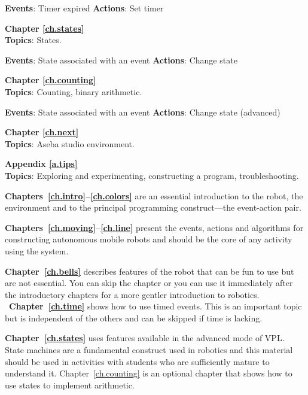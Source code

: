 \textbf{Events}: Timer expired \hfill \textbf{Actions}: Set timer

 \hfill {}

\bigskip

{\centering \textbf{Chapter \ref{ch.states}}\\}
\textbf{Topics}: States.

\textbf{Events}: State associated with an event \hfill \textbf{Actions}: Change state

 \hfill {}

\bigskip

{\centering \textbf{Chapter \ref{ch.counting}}\\}
\textbf{Topics}: Counting, binary arithmetic.

\textbf{Events}: State associated with an event  \hfill \textbf{Actions}: Change state (advanced)

 \hfill {}

\bigskip

{\centering \textbf{Chapter \ref{ch.next}}\\}
\textbf{Topics}: Aseba studio environment.

\bigskip

{\centering \textbf{Appendix \ref{a.tips}}\\}
\textbf{Topics}: Exploring and experimenting,
constructing a program, troubleshooting.



\textbf{Chapters~\ref{ch.intro}--\ref{ch.colors}} are an essential introduction
to the robot, the environment and to the principal programming construct---the
event-action pair.

\textbf{Chapters~\ref{ch.moving}--\ref{ch.line}} present the events, actions and algorithms
for constructing autonomous mobile robots and should be the core of any
activity using the system.

\textbf{Chapter~\ref{ch.bells}} describes features of the robot that can
be fun to use but are not essential. You can skip the chapter or you can 
use it immediately after the introductory chapters
for a more gentler introduction to robotics.
\
\textbf{Chapter~\ref{ch.time}} shows how to use timed events.
This is an important topic but is independent of the others
and can be skipped if time is lacking.

\textbf{Chapter~\ref{ch.states}} uses features available in the advanced mode of VPL.
State machines are a fundamental construct used in robotics and this material
should be used in activities with students who are sufficiently mature to understand it. Chapter~\ref{ch.counting} is an optional chapter that shows
how to use states to implement arithmetic.

